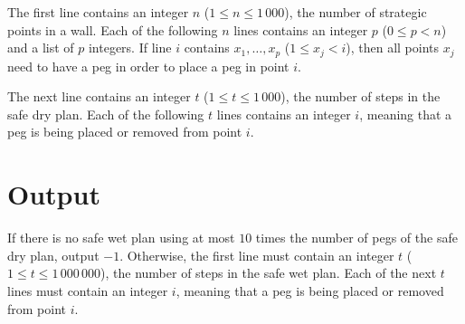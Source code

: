 The first line contains an integer $n$ ($1 \leq n \leq 1\,000$), the
number of strategic points in a wall. Each of the following $n$ lines
contains an integer $p$ ($0 \leq p < n$) and a list of $p$ integers. If line $i$ contains $x_1,\ldots,x_p$
($1 \leq x_j < i$), then all points $x_j$ need to have a peg in order to place
a peg in point $i$.

The next line contains an integer $t$ ($1 \leq t \leq 1\,000$), the
number of steps in the safe dry plan. Each of the following $t$ lines contains
an integer $i$, meaning that a peg is being placed or removed from
point $i$.

\section*{Output}

If there is no safe wet plan using at most $10$ times the number of
pegs of the safe dry plan, output $-1$. Otherwise, the first line must
contain an integer $t$ ($1 \leq t \leq 1\,000\,000$), the number of
steps in the safe wet plan. Each of the next $t$ lines must contain an
integer $i$, meaning that a peg is being placed or removed from point
$i$.

